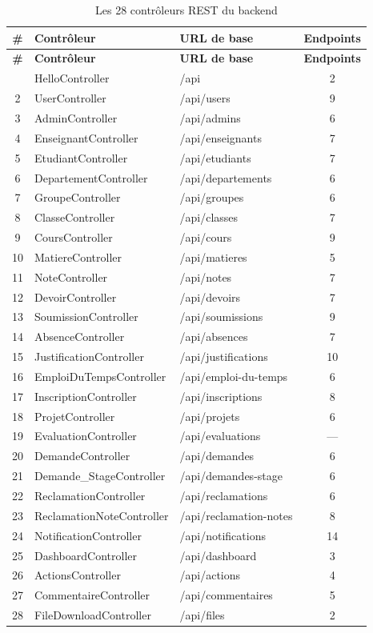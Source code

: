 \begin{longtable}{cllc}
\caption{Les 28 contrôleurs REST du backend} \\
\toprule
\textbf{\#} & \textbf{Contrôleur} & \textbf{URL de base} & \textbf{Endpoints} \\
\midrule
\endfirsthead
\toprule
\textbf{\#} & \textbf{Contrôleur} & \textbf{URL de base} & \textbf{Endpoints} \\
\midrule
\endhead
\bottomrule
\endfoot
1  & HelloController           & /api            & 2 \\
2  & UserController            & /api/users      & 9 \\
3  & AdminController           & /api/admins     & 6 \\
4  & EnseignantController      & /api/enseignants& 7 \\
5  & EtudiantController        & /api/etudiants  & 7 \\
6  & DepartementController     & /api/departements& 6 \\
7  & GroupeController          & /api/groupes    & 6 \\
8  & ClasseController          & /api/classes    & 7 \\
9  & CoursController           & /api/cours      & 9 \\
10 & MatiereController         & /api/matieres   & 5 \\
11 & NoteController            & /api/notes      & 7 \\
12 & DevoirController          & /api/devoirs    & 7 \\
13 & SoumissionController      & /api/soumissions& 9 \\
14 & AbsenceController         & /api/absences   & 7 \\
15 & JustificationController   & /api/justifications & 10 \\
16 & EmploiDuTempsController   & /api/emploi-du-temps& 6 \\
17 & InscriptionController     & /api/inscriptions& 8 \\
18 & ProjetController          & /api/projets    & 6 \\
19 & EvaluationController      & /api/evaluations& — \\
20 & DemandeController         & /api/demandes   & 6 \\
21 & Demande\_StageController  & /api/demandes-stage& 6 \\
22 & ReclamationController     & /api/reclamations& 6 \\
23 & ReclamationNoteController & /api/reclamation-notes& 8 \\
24 & NotificationController    & /api/notifications& 14 \\
25 & DashboardController       & /api/dashboard  & 3 \\
26 & ActionsController         & /api/actions    & 4 \\
27 & CommentaireController     & /api/commentaires& 5 \\
28 & FileDownloadController    & /api/files      & 2 \\
\end{longtable}

